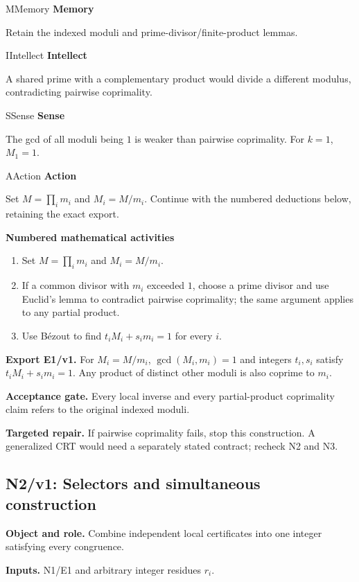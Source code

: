 \documentclass[preprint,12pt,aps,pra,showkeys,amsmath,amssymb,superscriptaddress,floatfix]{revtex4-2}
\theoremstyle{definition}
\theoremstyle{remark}
\newcommand{\mmfaculty}[3]{%
 \begin{mmfacultybox}{#1}{#2}
 {\sffamily\bfseries\color{MMBlue}#2}\par\smallskip #3
 \end{mmfacultybox}}
\newcommand{\field}[2]{\par\smallskip\noindent\textbf{#1.} #2\par}
\begin{document}
\mmfaculty{M}{Memory}{Retain the indexed moduli and prime-divisor/finite-product lemmas.}

\mmfaculty{I}{Intellect}{A shared prime with a complementary product would divide a different
modulus, contradicting pairwise coprimality.}

\mmfaculty{S}{Sense}{The gcd of all moduli being \(1\) is weaker than pairwise coprimality.
For \(k=1\), \(M_1=1\).}

\mmfaculty{A}{Action}{Set \(M=\prod_i m_i\) and \(M_i=M/m_i\). Continue with the numbered
deductions below, retaining the exact export.}

\smallskip\noindent\textbf{Numbered mathematical activities}

\begin{enumerate}[label=N1.\arabic*,leftmargin=3.4em]

\item Set \(M=\prod_i m_i\) and \(M_i=M/m_i\).

\item If a common divisor with \(m_i\) exceeded \(1\), choose a prime divisor
and use Euclid's lemma to contradict pairwise coprimality; the same
argument applies to any partial product.

\item Use Bézout to find \(t_iM_i+s_im_i=1\) for every \(i\).

\end{enumerate}

\field{Export E1/v1}{For \(M_i=M/m_i\), \(\gcd(M_i,m_i)=1\) and integers \(t_i,s_i\) satisfy
\(t_iM_i+s_im_i=1\). Any product of distinct other moduli is also
coprime to \(m_i\).}

\field{Acceptance gate}{Every local inverse and every partial-product coprimality claim refers
to the original indexed moduli.}

\field{Targeted repair}{If pairwise coprimality fails, stop this construction. A generalized CRT
would need a separately stated contract; recheck N2 and N3.}

\clearpage

\subsection{N2/v1: Selectors and simultaneous construction}

\field{Object and role}{Combine independent local certificates into one integer satisfying every
congruence.}

\field{Inputs}{N1/E1 and arbitrary integer residues \(r_i\).}
\end{document}
